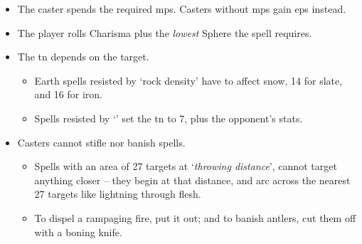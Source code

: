 \begin{itemize}
  \item
  The caster spends the required \glspl{mp}.
  Casters without \glspl{mp} gain \glspl{ep} instead.
  \item
  The player rolls Charisma plus the \emph{lowest} Sphere the spell requires.
  \item
  The \gls{tn} depends on the target.
  \begin{itemize}
    \item
    Earth spells resisted by `rock density' have \tn[7] to affect snow, 14 for slate, and 16 for iron.
    \item
    Spells resisted by `' set the \gls{tn} to 7, plus the opponent's stats.
  \end{itemize}
  \item
  Casters cannot stifle nor banish spells.
  \begin{itemize}
    \item
    Spells with an area of 27 targets at `\textit{throwing distance}', cannot target anything closer -- they begin at that distance, and arc across the nearest 27 targets like lightning through flesh.
    \item
    To dispel a rampaging fire, put it out; and to banish antlers, cut them off with a boning knife.
  \end{itemize}
\end{itemize}
